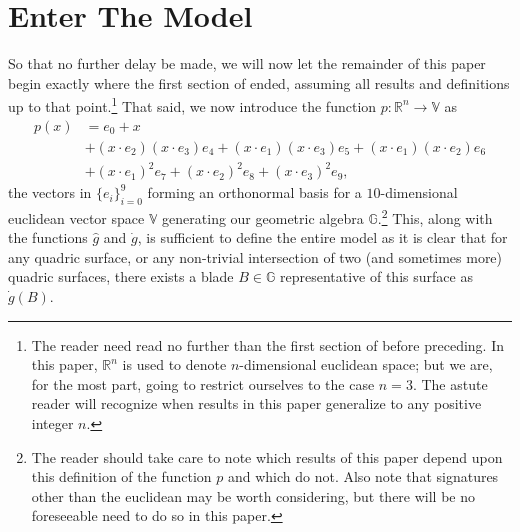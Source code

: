 \documentclass{birkjour}
\theoremstyle{definition}
\theoremstyle{remark}
\numberwithin{equation}{section}
\newcommand{\R}{\mathbb{R}}
\newcommand{\G}{\mathbb{G}}
\newcommand{\V}{\mathbb{V}}
\newcommand{\gd}{\dot{g}}
\newcommand{\gh}{\hat{g}}
\begin{document}
\section{Enter The Model}

So that no further delay be made, we will now let the remainder of this paper begin
exactly where the first section of \cite{Parkin13} ended, assuming all results and definitions up to that point.\footnote{The
reader need read no further than the first section of \cite{Parkin13} before preceding.  In this paper, $\R^n$ is used to
denote $n$-dimensional euclidean space; but we are, for the most part, going to restrict ourselves to the case $n=3$.
The astute reader will recognize when results in this paper generalize to any positive integer $n$.}
That said, we now introduce the function $p:\R^n\to\V$ as
\begin{align*}
p(x) &= e_0 + x \\
 &+ (x\cdot e_2)(x\cdot e_3)e_4 + (x\cdot e_1)(x\cdot e_3)e_5 + (x\cdot e_1)(x\cdot e_2)e_6 \\
 &+ (x\cdot e_1)^2e_7 + (x\cdot e_2)^2e_8 + (x\cdot e_3)^2 e_9,
\end{align*}
the vectors in $\{e_i\}_{i=0}^9$ forming an orthonormal basis for a $10$-dimensional
euclidean vector space $\V$ generating our geometric algebra $\G$.\footnote{The reader
should take care to note which results of this paper
depend upon this definition of the function $p$ and which do not.  Also note that signatures
other than the euclidean may be worth considering, but there will be no foreseeable need to do so in this paper.}
This, along with the functions $\gh$ and $\gd$, is
sufficient to define the entire model as it is clear that for any quadric
surface, or any non-trivial intersection of two (and sometimes more) quadric surfaces,
there exists a blade
$B\in\G$ representative of this surface as $\gd(B)$.
\end{document}
